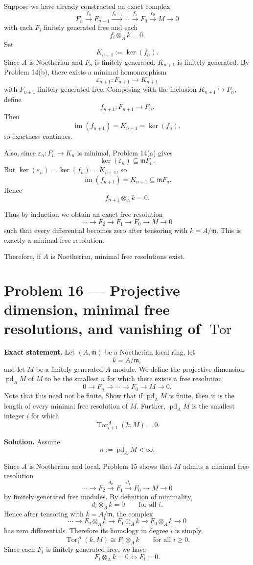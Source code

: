 \documentclass[12pt,a4paper]{article}
\theoremstyle{plain}
\theoremstyle{definition}      %
\begin{document}
Suppose we have already constructed an exact complex
\[
F_n\xrightarrow{f_n}F_{n-1}\xrightarrow{f_{n-1}}\cdots\xrightarrow{f_1}F_0\xrightarrow{\varepsilon_0}M\to 0
\]
with each \(F_i\) finitely generated free and each
\[
f_i\otimes_A k=0.
\]
Set
\[
K_{n+1}:=\ker(f_n).
\]
Since \(A\) is Noetherian and \(F_n\) is finitely generated, \(K_{n+1}\) is finitely generated. By Problem 14(b), there exists a minimal homomorphism
\[
\varepsilon_{n+1}:F_{n+1}\to K_{n+1}
\]
with \(F_{n+1}\) finitely generated free. Composing with the inclusion \(K_{n+1}\hookrightarrow F_n\), define
\[
f_{n+1}:F_{n+1}\to F_n.
\]
Then
\[
\operatorname{im}(f_{n+1})=K_{n+1}=\ker(f_n),
\]
so exactness continues.

Also, since \(\varepsilon_n:F_n\to K_n\) is minimal, Problem 14(a) gives
\[
\ker(\varepsilon_n)\subseteq \mathfrak m F_n.
\]
But \(\ker(\varepsilon_n)=\ker(f_n)=K_{n+1}\), so
\[
\operatorname{im}(f_{n+1})=K_{n+1}\subseteq \mathfrak m F_n.
\]
Hence
\[
f_{n+1}\otimes_A k=0.
\]

Thus by induction we obtain an exact free resolution
\[
\cdots \to F_2\to F_1\to F_0\to M\to 0
\]
such that every differential becomes zero after tensoring with \(k=A/\mathfrak m\). This is exactly a minimal free resolution.

\medskip

Therefore, if \(A\) is Noetherian, minimal free resolutions exist.

\section*{Problem 16 --- Projective dimension, minimal free resolutions, and vanishing of \texorpdfstring{$\operatorname{Tor}$}{Tor}}

\textbf{Exact statement.}
Let \((A,\mathfrak m)\) be a Noetherian local ring, let
\[
k=A/\mathfrak m,
\]
and let \(M\) be a finitely generated \(A\)-module. We define the projective dimension \(\operatorname{pd}_A M\) of \(M\) to be the smallest \(n\) for which there exists a free resolution
\[
0\to F_n\to \cdots \to F_0\to M\to 0.
\]
Note that this need not be finite. Show that if \(\operatorname{pd}_A M\) is finite, then it is the length of every minimal free resolution of \(M\). Further, \(\operatorname{pd}_A M\) is the smallest integer \(i\) for which
\[
\operatorname{Tor}_{i+1}^A(k,M)=0.
\]

\textbf{Solution.}
Assume
\[
n:=\operatorname{pd}_A M<\infty.
\]

Since \(A\) is Noetherian and local, Problem 15 shows that \(M\) admits a minimal free resolution
\[
\cdots \longrightarrow F_2 \xrightarrow{d_2} F_1 \xrightarrow{d_1} F_0 \longrightarrow M \longrightarrow 0
\]
by finitely generated free modules. By definition of minimality,
\[
d_i\otimes_A k=0
\qquad\text{for all }i.
\]
Hence after tensoring with \(k=A/\mathfrak m\), the complex
\[
\cdots \longrightarrow F_2\otimes_A k \longrightarrow F_1\otimes_A k \longrightarrow F_0\otimes_A k \longrightarrow 0
\]
has zero differentials. Therefore its homology in degree \(i\) is simply
\[
\operatorname{Tor}_i^A(k,M)\cong F_i\otimes_A k
\qquad\text{for all }i\ge 0.
\]
Since each \(F_i\) is finitely generated free, we have
\[
F_i\otimes_A k=0 \iff F_i=0.
\]
\end{document}
